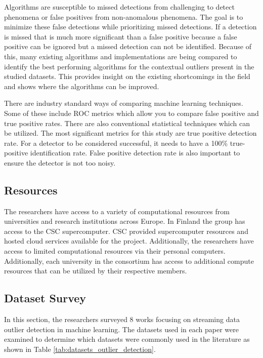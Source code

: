 Algorithms are susceptible to missed detections from challenging to detect phenomena or false positives from non-anomalous phenomena. The goal is to minimize these false detections while prioritizing missed detections. If a detection is missed that is much more significant than a false positive because a false positive can be ignored but a missed detection can not be identified. Because of this, many existing algorithms and implementations are being compared to identify the best performing algorithms for the contextual outliers present in the studied datasets. This provides insight on the existing shortcomings in the field and shows where the algorithms can be improved.

There are industry standard ways of comparing machine learning techniques. Some of these include ROC metrics which allow you to compare false positive and true positive rates. There are also conventional statistical techniques which can be utilized. The most significant metrics for this study are true positive detection rate. For a detector to be considered successful, it needs to have a 100\% true-positive identification rate. False positive detection rate is also important to ensure the detector is not too noisy.


\subsection{Resources}

The researchers have access to a variety of computational resources from universities and research institutions across Europe. In Finland the group has access to the CSC supercomputer. CSC provided supercomputer resources and hosted cloud services available for the project. Additionally, the researchers have access to limited computational resources via their personal computers. Additionally, each university in the consortium has access to additional compute resources that can be utilized by their respective members.

\subsection{Dataset Survey}
\label{ref_dataset_survey}

In this section, the researchers surveyed 8 works focusing on streaming data outlier detection in machine learning. The datasets used in each paper were examined to determine which datasets were commonly used in the literature as shown in Table \ref{tab:datasets_outlier_detection}. 

